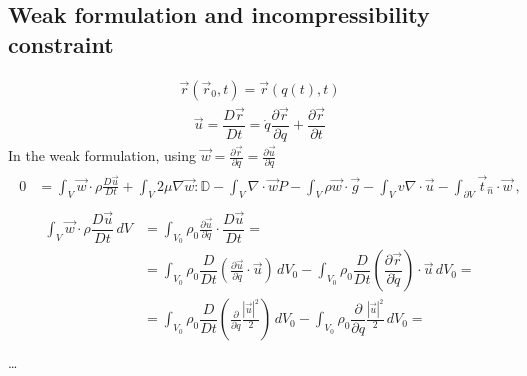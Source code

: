 \documentclass[letterpaper,10pt,english]{jupyterBook}
\begin{document}
\subsection{Weak formulation and incompressibility constraint}
\label{\detokenize{ch/pde/ns:weak-formulation-and-incompressibility-constraint}}\begin{equation*}
\begin{split}\vec{r}(\vec{r}_0, t) = \vec{r}(q(t), t)\end{split}
\end{equation*}\begin{equation*}
\begin{split}\vec{u} = \dfrac{D \vec{r}}{D t} = \dot{q} \dfrac{\partial \vec{r}}{\partial q} + \dfrac{\partial \vec{r}}{\partial t}\end{split}
\end{equation*}
\sphinxAtStartPar
In the weak formulation, using \(\vec{w} = \frac{\partial \vec{r}}{\partial q} = \frac{\partial \vec{u}}{\partial \dot{q}}\)
\begin{equation*}
\begin{split}\begin{aligned}
  0
  & = \int_{V} \vec{w} \cdot \rho \frac{D \vec{u}}{D t} + \int_V 2 \mu \nabla \vec{w} : \mathbb{D} - \int_V \nabla \cdot \vec{w} P - \int_V \rho \vec{w} \cdot \vec{g} - \int_{V} v \nabla \cdot \vec{u} - \int_{\partial V} \vec{t}_{\hat{n}} \cdot \vec{w} \ ,
\end{aligned}\end{split}
\end{equation*}\begin{equation*}
\begin{split}\begin{aligned}
  \int_V  \vec{w} \cdot \rho \dfrac{D \vec{u}}{Dt} \, dV 
  & = \int_{V_0} \rho_0 \frac{\partial \vec{u}}{\partial \dot{q}} \cdot \dfrac{D \vec{u}}{D t} = \\ 
  & = \int_{V_0} \rho_0 \dfrac{D}{D t} \left( \frac{\partial \vec{u}}{\partial \dot{q}} \cdot \vec{u} \right) \, dV_0
    - \int_{V_0} \rho_0 \dfrac{D}{Dt} \left( \dfrac{\partial \vec{r}}{\partial \dot{q}} \right) \cdot \vec{u} \, dV_0  = \\ 
  & = \int_{V_0} \rho_0 \dfrac{D}{D t} \left( \frac{\partial}{\partial \dot{q}} \frac{|\vec{u}|^2}{2} \right) \, dV_0
    - \int_{V_0} \rho_0 \dfrac{\partial }{\partial q} \frac{|\vec{u}|^2}{2} \, dV_0  = \\ 
\end{aligned}\end{split}
\end{equation*}
\sphinxAtStartPar
…
\end{document}
